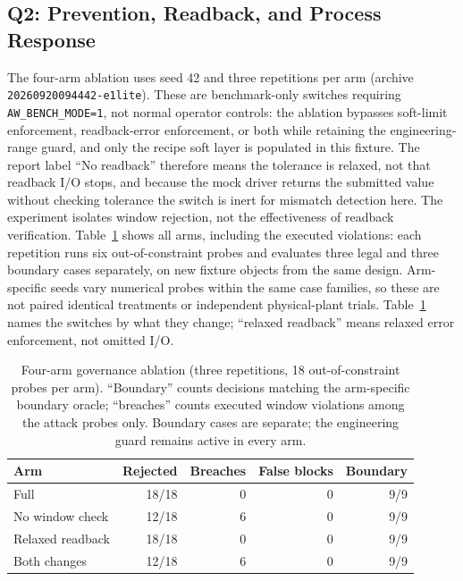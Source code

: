 \subsection{Q2: Prevention, Readback, and Process Response}
\label{sec:e1lite}
The four-arm ablation uses seed 42 and three repetitions per arm
(archive \texttt{20260920094442-e1lite}). These are benchmark-only switches requiring
\texttt{AW\_BENCH\_MODE=1}, not normal operator controls: the ablation
bypasses soft-limit enforcement, readback-error enforcement, or both while
retaining the engineering-range guard, and only the recipe soft layer is
populated in this fixture. The report label ``No readback'' therefore means
the tolerance is relaxed, not that readback I/O stops, and because the mock
driver returns the submitted value without checking tolerance the switch is
inert for mismatch detection here. The experiment isolates window rejection,
not the effectiveness of readback verification. Table~\ref{tab:e1lite} shows
all arms, including the executed violations: each repetition runs six
out-of-constraint probes and evaluates three legal and three boundary cases
separately, on new fixture objects from the same design. Arm-specific seeds
vary numerical probes within the same case families, so these are not paired
identical treatments or independent physical-plant trials. Table~\ref{tab:e1lite} names the switches by what they change;
``relaxed readback'' means relaxed error enforcement, not omitted I/O.

\begin{table}[!t]
\centering
\caption{Four-arm governance ablation (three repetitions, 18 out-of-constraint probes per arm). ``Boundary'' counts decisions matching the arm-specific boundary oracle; ``breaches'' counts executed window violations among the attack probes only. Boundary cases are separate; the engineering guard remains active in every arm.}
\label{tab:e1lite}
\footnotesize
\setlength{\tabcolsep}{2.4pt}
\begin{tabular}{@{}lrrrr@{}}
\toprule
Arm & Rejected & Breaches & False blocks & Boundary \\
\midrule
Full & 18/18 & 0 & 0 & 9/9 \\
No window check & 12/18 & 6 & 0 & 9/9 \\
Relaxed readback & 18/18 & 0 & 0 & 9/9 \\
Both changes & 12/18 & 6 & 0 & 9/9 \\
\bottomrule
\end{tabular}
\end{table}

